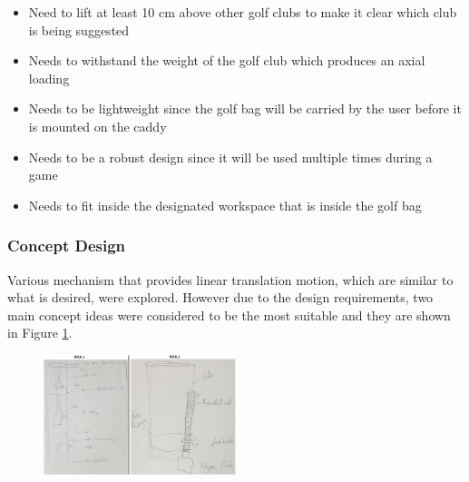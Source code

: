\documentclass[11pt,landscape]{article}
\begin{document}
\begin{multicols}{2}
    
    \begin{itemize}
    \item Need to lift at least 10 cm above other golf clubs to make it clear
    which club is being suggested
    \item Needs to withstand the weight of the golf club which produces an axial
    loading
    \item Needs to be lightweight since the golf bag will be carried by the user
    before it is mounted on the caddy
    \item Needs to be a robust design since it will be used multiple times
    during a game
    \item Needs to fit inside the designated workspace that is inside the golf
    bag
    \end{itemize}
    
    \subsubsection{Concept Design}
    Various mechanism that provides linear translation motion, which are similar
    to what is desired, were explored. However due to the design requirements,
    two main concept ideas were considered to be the most suitable and they are
    shown in Figure \ref{fig:design}.
    
    \begin{figure}[H]
        \begin{center}
            \includegraphics[width=0.5\textwidth]{Figure19.jpg}
            \label{fig:design}
        \end{center}
    \end{figure}
    

\end{multicols}
\end{document}
